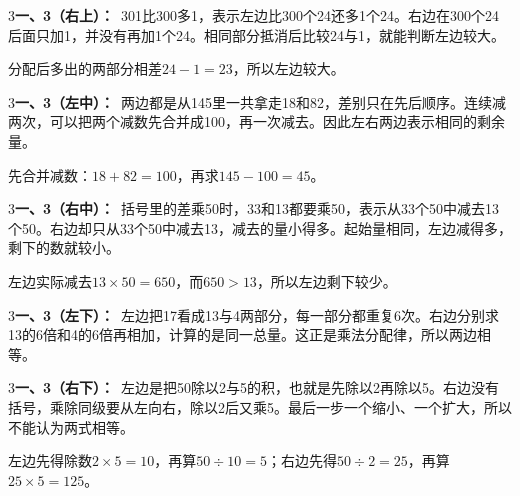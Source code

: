 \documentclass[multi=snippet,border={5bp 20bp 5bp 5bp}]{standalone}
\newenvironment{snippet}[3]{\begin{minipage}{#1bp}\color{answerred}\fontsize{#2}{#3}\selectfont\raggedright}{\end{minipage}}
\begin{document}
\begin{snippet}{505}{11.5}{14}\begin{multicols}{3}\raggedcolumns \textbf{一、3（右上）：}\ 301比300多1，表示左边比300个24还多1个24。右边在300个24后面只加1，并没有再加1个24。相同部分抵消后比较24与1，就能判断左边较大。\par 分配后多出的两部分相差\(24-1=23\)\allowbreak ，所以左边较大。\end{multicols}\end{snippet}
\begin{snippet}{505}{11.5}{14}\begin{multicols}{3}\raggedcolumns \textbf{一、3（左中）：}\ 两边都是从145里一共拿走18和82，差别只在先后顺序。连续减两次，可以把两个减数先合并成100，再一次减去。因此左右两边表示相同的剩余量。\par 先合并减数：\(18+82=100\)\allowbreak ，再求\(145-100=45\)\allowbreak 。\end{multicols}\end{snippet}
\begin{snippet}{505}{11.5}{14}\begin{multicols}{3}\raggedcolumns \textbf{一、3（右中）：}\ 括号里的差乘50时，33和13都要乘50，表示从33个50中减去13个50。右边却只从33个50中减去13，减去的量小得多。起始量相同，左边减得多，剩下的数就较小。\par 左边实际减去\(13\times50=650\)\allowbreak ，而\(650>13\)\allowbreak ，所以左边剩下较少。\end{multicols}\end{snippet}
\begin{snippet}{505}{11.5}{14}\begin{multicols}{3}\raggedcolumns \textbf{一、3（左下）：}\ 左边把17看成13与4两部分，每一部分都重复6次。右边分别求13的6倍和4的6倍再相加，计算的是同一总量。这正是乘法分配律，所以两边相等。\end{multicols}\end{snippet}
\begin{snippet}{505}{11.5}{14}\begin{multicols}{3}\raggedcolumns \textbf{一、3（右下）：}\ 左边是把50除以2与5的积，也就是先除以2再除以5。右边没有括号，乘除同级要从左向右，除以2后又乘5。最后一步一个缩小、一个扩大，所以不能认为两式相等。\par 左边先得除数\(2\times5=10\)\allowbreak ，再算\(50\div10=5\)\allowbreak ；右边先得\(50\div2=25\)\allowbreak ，再算\(25\times5=125\)\allowbreak 。\end{multicols}\end{snippet}
\end{document}
